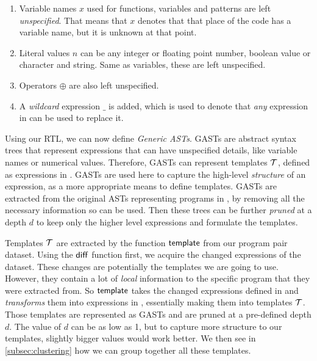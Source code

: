 \begin{enumerate}
    \item Variable names $x$ used for functions, variables and patterns are left
    \emph{unspecified}. That means that $x$ denotes that that place of the code
    has a variable name, but it is unknown at that point.
    \item Literal values $n$ can be any integer or floating point number,
    boolean value or character and string. Same as variables, these are left
    unspecified.
    \item Operators $\oplus$ are also left unspecified.
    \item A \emph{wildcard} expression $\_$ is added, which is used to denote
    that \emph{any} expression in \repairLang can be used to replace it.
\end{enumerate}

Using our RTL, we can now define \emph{Generic ASTs}. GASTs are abstract syntax
trees that represent expressions that can have unspecified details, like
variable names or numerical values. Therefore, GASTs can represent templates
$\mathcal{T}$, defined as expressions in \repairLang. GASTs are used here to capture the
high-level \emph{structure} of an expression, as a more appropriate means to
define templates. GASTs are extracted from the original ASTs representing
programs in \lang, by removing all the necessary information so \repairLang can
be used. Then these trees can be further \emph{pruned} at a depth $d$ to keep
only the higher level expressions and formulate the templates.


Templates $\mathcal{T}$ are extracted by the function $\mathsf{template}$ from our program
pair dataset. Using the $\mathsf{diff}$ function first, we acquire the changed
expressions of the dataset. These changes are potentially the templates we are
going to use. However, they contain a lot of \emph{local} information to the
specific program that they were extracted from. So $\mathsf{template}$ takes the
changed expressions defined in \lang and \emph{transforms} them into expressions
in \repairLang, essentially making them into templates $\mathcal{T}$. Those templates are
represented as GASTs and are pruned at a pre-defined depth $d$. The value of $d$
can be as low as 1, but to capture more structure to our templates, slightly
bigger values would work better. We then see in \autoref{subsec:clustering} how
we can group together all these templates.

